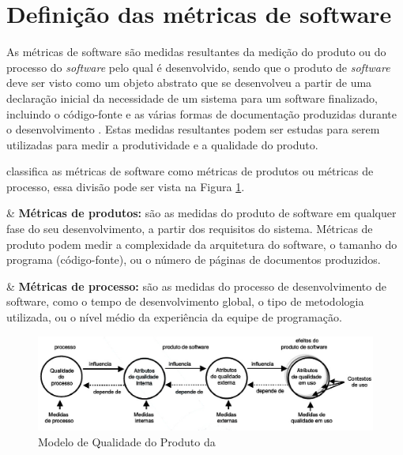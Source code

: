 
\section{Definição das métricas de software}

As métricas de software são medidas resultantes da medição do produto ou do processo do \textit{software} pelo qual é desenvolvido, sendo que o produto de \textit{software} deve ser visto como um objeto abstrato que se desenvolveu a partir de uma declaração inicial da necessidade de um sistema para um software finalizado, incluindo o código-fonte e as várias formas de documentação produzidas durante o desenvolvimento \cite{Mills:1999}. Estas medidas resultantes podem ser estudas para serem utilizadas para medir a produtividade e a qualidade do produto. 


 classifica as métricas de software como métricas de produtos ou métricas de processo, essa divisão pode ser vista na Figura \ref{modelodequalidade}. 

\begin{easylist}[itemize]	

& \textbf{Métricas de produtos:} são as medidas do produto de software em qualquer fase do seu desenvolvimento, a partir dos requisitos do sistema. Métricas de produto podem medir a complexidade da arquitetura do software, o tamanho do programa (código-fonte), ou o número de páginas de documentos produzidos. 

& \textbf{Métricas de processo:} são as medidas do processo de desenvolvimento de software, como o tempo de desenvolvimento global, o tipo de metodologia utilizada, ou o nível médio da experiência da equipe de programação.

\end{easylist}

\begin{figure}[h!]
\centering
\includegraphics[keepaspectratio=false,scale=0.65]{figuras/figuras_nilton/modeloqualidade.eps}
\caption{Modelo de Qualidade do Produto da }
\label{modelodequalidade}
\end{figure}
\FloatBarrier

